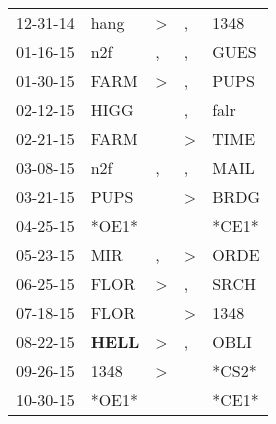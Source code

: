 \begin{supertabular}{p{0.07\textwidth}p{0.06\textwidth}p{0.02\textwidth}p{0.02\textwidth}p{0.06\textwidth}}
          12-31-14\textsuperscript{} &           hang\textsuperscript{} &     \textgreater &                , &           1348\textsuperscript{} \\
          01-16-15\textsuperscript{} &            n2f\textsuperscript{} &                , &                , &           GUES\textsuperscript{} \\
          01-30-15\textsuperscript{} &           FARM\textsuperscript{} &     \textgreater &                , &           PUPS\textsuperscript{} \\
          02-12-15\textsuperscript{} &           HIGG\textsuperscript{} &                  &                , &           falr\textsuperscript{} \\
          02-21-15\textsuperscript{} &           FARM\textsuperscript{} &                  &     \textgreater &           TIME\textsuperscript{} \\
          03-08-15\textsuperscript{} &            n2f\textsuperscript{} &                , &                , &           MAIL\textsuperscript{} \\
          03-21-15\textsuperscript{} &           PUPS\textsuperscript{} &                  &     \textgreater &           BRDG\textsuperscript{} \\
          04-25-15\textsuperscript{} &                            *OE1* &                  &                  &                            *CE1* \\
          05-23-15\textsuperscript{} &            MIR\textsuperscript{} &                , &     \textgreater &           ORDE\textsuperscript{} \\
          06-25-15\textsuperscript{} &           FLOR\textsuperscript{} &     \textgreater &                , &           SRCH\textsuperscript{} \\
          07-18-15\textsuperscript{} &           FLOR\textsuperscript{} &                  &     \textgreater &           1348\textsuperscript{} \\
          08-22-15\textsuperscript{} &  \textbf{HELL\textsuperscript{}} &     \textgreater &                , &           OBLI\textsuperscript{} \\
          09-26-15\textsuperscript{} &           1348\textsuperscript{} &     \textgreater &                  &                            *CS2* \\
          10-30-15\textsuperscript{} &                            *OE1* &                  &                  &                            *CE1* \\

\end{supertabular}

